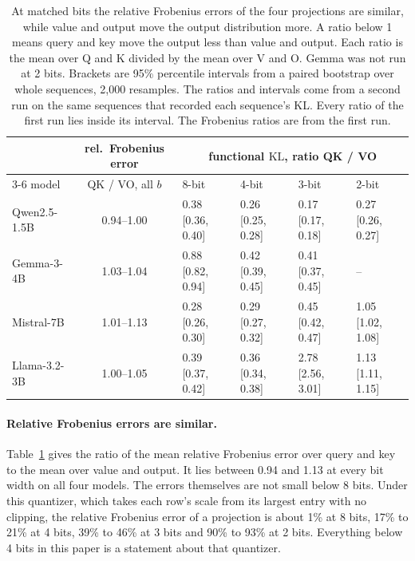 \documentclass[10pt]{article}
\newcommand{\KL}{\mathrm{KL}}
\begin{document}
\begin{table}[t]
\centering
\small
\setlength{\tabcolsep}{4pt}
\begin{tabular}{lcllll}
\toprule
 & rel.\ Frobenius error & \multicolumn{4}{c}{functional $\KL$, ratio QK / VO} \\
\cmidrule(lr){3-6}
model & QK / VO, all $b$ & 8-bit & 4-bit & 3-bit & 2-bit \\
\midrule
Qwen2.5-1.5B & 0.94--1.00 & 0.38 [0.36, 0.40] & 0.26 [0.25, 0.28] & 0.17 [0.17, 0.18] & 0.27 [0.26, 0.27] \\
Gemma-3-4B & 1.03--1.04 & 0.88 [0.82, 0.94] & 0.42 [0.39, 0.45] & 0.41 [0.37, 0.45] & -- \\
Mistral-7B & 1.01--1.13 & 0.28 [0.26, 0.30] & 0.29 [0.27, 0.32] & 0.45 [0.42, 0.47] & 1.05 [1.02, 1.08] \\
Llama-3.2-3B & 1.00--1.05 & 0.39 [0.37, 0.42] & 0.36 [0.34, 0.38] & 2.78 [2.56, 3.01] & 1.13 [1.11, 1.15] \\
\bottomrule
\end{tabular}
\caption{At matched bits the relative Frobenius errors of the four projections are similar,
while value and output move the output distribution more. A ratio below 1 means query and key
move the output less than value and output. Each ratio is the mean over Q and K divided by the
mean over V and O. Gemma was not run at 2 bits. Brackets are 95\% percentile intervals from a paired bootstrap
over whole sequences, 2{,}000 resamples. The ratios and intervals come from a second run on the
same sequences that recorded each sequence's KL. Every ratio of the first run lies inside its
interval. The Frobenius ratios are from the first run.}
\label{tab:proj}
\end{table}

\paragraph{Relative Frobenius errors are similar.} Table~\ref{tab:proj} gives the ratio of the
mean relative Frobenius error over query and key to the mean over value and output. It lies
between 0.94 and 1.13 at every bit width on all four models. The errors themselves are not
small below 8 bits. Under this quantizer, which takes each row's scale from its largest entry
with no clipping, the relative Frobenius error of a projection is about 1\% at 8 bits, 17\% to
21\% at 4 bits, 39\% to 46\% at 3 bits and 90\% to 93\% at 2 bits. Everything below 4 bits in
this paper is a statement about that quantizer.
\end{document}
